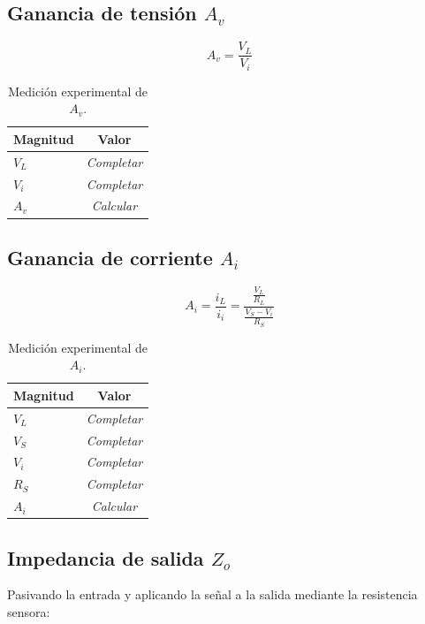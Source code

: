 \documentclass[a4paper,12pt]{article}
\begin{document}
\subsection{Ganancia de tensión $A_v$}

\[
A_v
=
\frac{V_L}{V_i}
\]

\begin{table}[H]
\centering
\caption{Medición experimental de $A_v$.}
\begin{tabular}{lc}
\toprule
Magnitud & Valor\\
\midrule
$V_L$ & \textit{Completar}\\
$V_i$ & \textit{Completar}\\
$A_v$ & \textit{Calcular}\\
\bottomrule
\end{tabular}
\end{table}

\subsection{Ganancia de corriente $A_i$}

\[
A_i
=
\frac{i_L}{i_i}
=
\frac{\frac{V_L}{R_L}}
{\frac{V_S-V_i}{R_S}}
\]

\begin{table}[H]
\centering
\caption{Medición experimental de $A_i$.}
\begin{tabular}{lc}
\toprule
Magnitud & Valor\\
\midrule
$V_L$ & \textit{Completar}\\
$V_S$ & \textit{Completar}\\
$V_i$ & \textit{Completar}\\
$R_S$ & \textit{Completar}\\
$A_i$ & \textit{Calcular}\\
\bottomrule
\end{tabular}
\end{table}

\subsection{Impedancia de salida $Z_o$}

Pasivando la entrada y aplicando la señal a la salida mediante la resistencia sensora:
\end{document}

